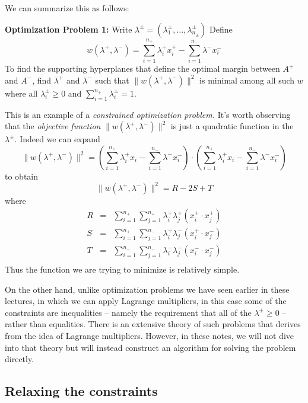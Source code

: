 \documentclass[
  oneside]{scrbook}
\begin{document}
We can summarize this as follows:

\textbf{Optimization Problem 1:} Write
\(\lambda^{\pm}=(\lambda^{\pm}_{1},\ldots, \lambda^{\pm}_{n_{\pm}})\)
Define \[
w(\lambda^+,\lambda^-) = \sum_{i=1}^{n_{+}}\lambda^{+}_{i}x^{+}_{i} - \sum_{i=1}^{n_{-}}\lambda^{-}x^{-}_{i}
\] To find the supporting hyperplanes that define the optimal margin
between \(A^{+}\) and \(A^{-}\), find \(\lambda^{+}\) and
\(\lambda^{-}\) such that \(\|w(\lambda^{+},\lambda^{-})\|^2\) is
minimal among all such \(w\) where all \(\lambda^{\pm}_{i}\ge 0\) and
\(\sum_{i=1}^{n_{\pm}} \lambda^{\pm}_{i}=1\).

This is an example of a \emph{constrained optimization problem.} It's
worth observing that the \emph{objective function}
\(\|w(\lambda^{+},\lambda^{-})\|^2\) is just a quadratic function in the
\(\lambda^{\pm}.\) Indeed we can expand \[
\|w(\lambda^{+},\lambda^{-})\|^2 = (\sum_{i=1}^{n_{+}}\lambda^{+}_{i}x_{i}- \sum_{i=1}^{n_{-}}\lambda^{-}x^{-}_{i})\cdot(\sum_{i=1}^{n_{+}}\lambda^{+}_{i}x_{i}- \sum_{i=1}^{n_{-}}\lambda^{-}x^{-}_{i})
\] to obtain \[
\|w(\lambda^{+},\lambda^{-})\|^2 = R -2S +T
\] where \begin{equation}
\begin{aligned}
R &=& \sum_{i=1}^{n_{+}}\sum_{j=1}^{n_{+}}\lambda^{+}_{i}\lambda^{+}_{j}(x^{+}_{i}\cdot x^{+}_{j}) \\
S &=& \sum_{i=1}^{n_{+}}\sum_{j=1}^{n_{-}}\lambda^{+}_{i}\lambda^{-}_{j}(x^{+}_{i}\cdot x^{-}_{j}) \\
T &=& \sum_{i=1}^{n_{-}}\sum_{j=1}^{n_{-}}\lambda^{-}_{i}\lambda^{-}_{j}(x^{-}_{i}\cdot x^{-}_{j}) \\
\end{aligned}
\label{eq:kernel}\end{equation} Thus the function we are trying to
minimize is relatively simple.

On the other hand, unlike optimization problems we have seen earlier in
these lectures, in which we can apply Lagrange multipliers, in this case
some of the constraints are inequalities -- namely the requirement that
all of the \(\lambda^{\pm}\ge 0\) -- rather than equalities. There is an
extensive theory of such problems that derives from the idea of Lagrange
multipliers. However, in these notes, we will not dive into that theory
but will instead construct an algorithm for solving the problem
directly.

\hypertarget{relaxing-the-constraints}{%
\subsection{Relaxing the constraints}\label{relaxing-the-constraints}}
\end{document}
